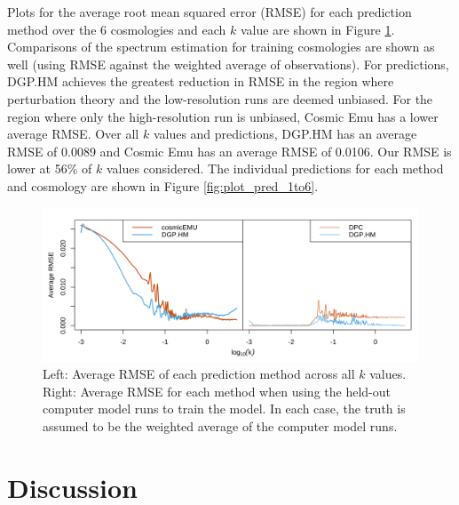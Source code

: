 \documentclass[11pt]{article}
\begin{document}
Plots for the average root mean squared error (RMSE) for each prediction method over the 
6 cosmologies and each $k$ value are shown in Figure \ref{fig:plot_rmse_k}. Comparisons 
of the spectrum estimation for training cosmologies are shown as well (using RMSE against 
the weighted average of observations). For predictions, DGP.HM achieves the greatest 
reduction in RMSE in the region where perturbation theory and the low-resolution runs 
are deemed unbiased. For the region where only the high-resolution run is unbiased, 
Cosmic Emu has a lower average RMSE. Over all $k$ values and predictions, DGP.HM has 
an average RMSE of 0.0089 and Cosmic Emu has an average RMSE of 0.0106. Our RMSE is 
lower at 56\% of $k$ values considered. The individual predictions for each method and 
cosmology are shown in Figure \ref{fig:plot_pred_1to6}.

\begin{figure}[ht]
    \centering
    \includegraphics[width=6in]{rmse_by_k.png}
    \caption{Left: Average RMSE of each prediction method across all $k$ values. 
             Right: Average RMSE for each method when using the held-out computer 
             model runs to train the model. In each case, the truth is assumed to 
             be the weighted average of the computer model runs.}
    \label{fig:plot_rmse_k}
\end{figure}


\section{Discussion}
\label{sec:disc}
\end{document}
